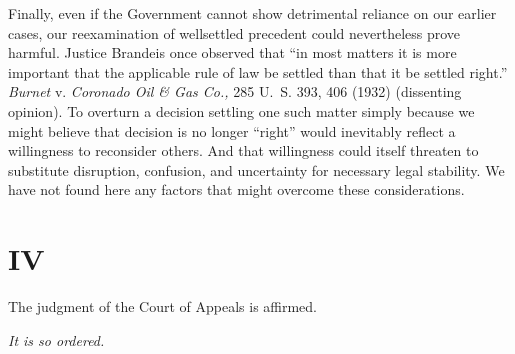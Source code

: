   Finally, even if the Government cannot show detrimental reliance on our earlier cases, our reexamination of wellsettled precedent could nevertheless prove harmful. Justice Brandeis once observed that ``in most matters it is more important that the applicable rule of law be settled than that it be settled right.'' \emph{Burnet} v. \emph{Coronado Oil \& Gas Co.,} 285 U.~S. 393, 406 (1932) (dissenting opinion). To overturn a decision settling one such matter simply because we might believe that decision is no longer ``right'' would inevitably reflect a willingness to reconsider others. And that willingness could itself threaten to substitute disruption, confusion, and uncertainty for necessary legal stability. We have not found here any factors that might overcome these considerations.

\section{IV}

  The judgment of the Court of Appeals is affirmed.

\begin{flushright}\emph{It is so ordered.}\end{flushright}
